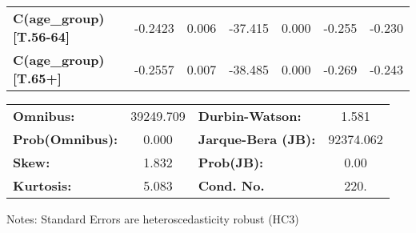 \begin{center}
\begin{tabular}{lcccccc}
\textbf{C(age\_group)[T.56-64]}                                                   &      -0.2423  &        0.006     &   -37.415  &         0.000        &       -0.255    &       -0.230     \\
\textbf{C(age\_group)[T.65+]}                                                     &      -0.2557  &        0.007     &   -38.485  &         0.000        &       -0.269    &       -0.243     \\
\bottomrule
\end{tabular}
\begin{tabular}{lclc}
\textbf{Omnibus:}       & 39249.709 & \textbf{  Durbin-Watson:     } &     1.581  \\
\textbf{Prob(Omnibus):} &    0.000  & \textbf{  Jarque-Bera (JB):  } & 92374.062  \\
\textbf{Skew:}          &    1.832  & \textbf{  Prob(JB):          } &      0.00  \\
\textbf{Kurtosis:}      &    5.083  & \textbf{  Cond. No.          } &      220.  \\
\bottomrule
\end{tabular}
\end{center}

Notes: \newline
 [1] Standard Errors are heteroscedasticity robust (HC3)